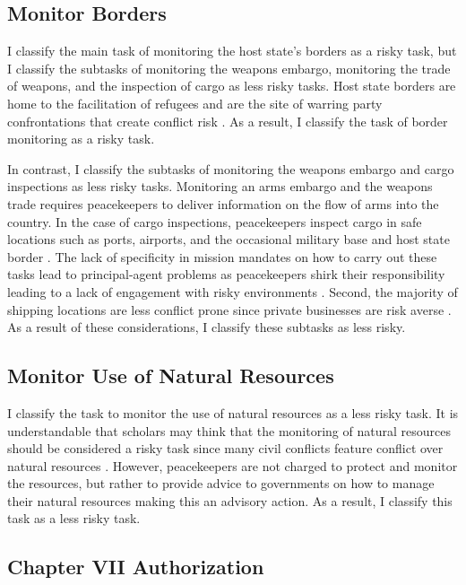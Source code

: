 \subsection*{Monitor Borders}

I classify the main task of monitoring the host state's borders as a risky task, but I classify the subtasks of monitoring the weapons embargo, monitoring the trade of weapons, and the inspection of cargo as less risky tasks. Host state borders are home to the facilitation of refugees and are the site of warring party confrontations that create conflict risk \citep{beardsley2011,townsen2014}. As a result, I classify the task of border monitoring as a risky task.

In contrast, I classify the subtasks of monitoring the weapons embargo and cargo inspections as less risky tasks. Monitoring an arms embargo and the weapons trade requires peacekeepers to deliver information on the flow of arms into the country. In the case of cargo inspections, peacekeepers inspect cargo in safe locations such as ports, airports, and the occasional military base and host state border \citep{TAMM_Codebook}. The lack of specificity in mission mandates on how to carry out these tasks lead to principal-agent problems as peacekeepers shirk their responsibility leading to a lack of engagement with risky environments \citep{bellamy2010}. Second, the majority of shipping locations are less conflict prone since private businesses are risk averse \citep{morrow1998}. As a result of these considerations, I classify these subtasks as less risky. 

\subsection*{Monitor Use of Natural Resources}

I classify the task to monitor the use of natural resources as a less risky task. It is understandable that scholars may think that the monitoring of natural resources should be considered a risky task since many civil conflicts feature conflict over natural resources \citep{lujala2009}. However, peacekeepers are not charged to protect and monitor the resources, but rather to provide advice to governments on how to manage their natural resources \citep{res_2556} making this an advisory action. As a result, I classify this task as a less risky task.

\subsection*{Chapter VII Authorization}

